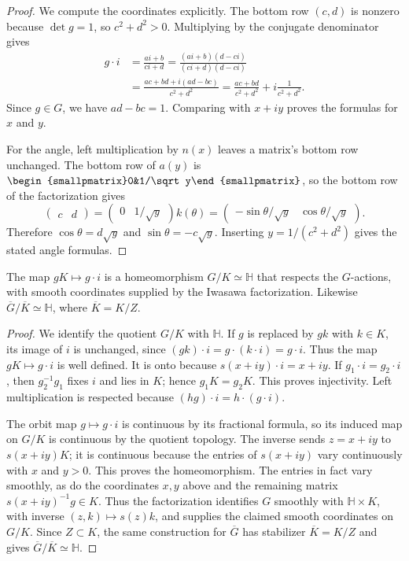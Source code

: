 \begin{proof}
We compute the coordinates explicitly. The bottom row $(c,d)$ is nonzero because $\det g=1$, so $c^2+d^2>0$. Multiplying by the conjugate denominator gives
\[
 \begin{aligned}
 g\cdot i
 &=\frac{ai+b}{ci+d}
  =\frac{(ai+b)(d-ci)}{(ci+d)(d-ci)}\\
 &=\frac{ac+bd+i(ad-bc)}{c^2+d^2}
  =\frac{ac+bd}{c^2+d^2}+i\frac1{c^2+d^2}.
 \end{aligned}
\]
Since $g\in G$, we have $ad-bc=1$. Comparing with $x+iy$ proves the formulas for $x$ and $y$.

For the angle, left multiplication by $n(x)$ leaves a matrix's bottom row unchanged. The bottom row of $a(y)$ is $\begin{smallpmatrix}0&1/\sqrt y\end{smallpmatrix}$, so the bottom row of the factorization gives
\[
 \begin{pmatrix}c&d\end{pmatrix}
 =\begin{pmatrix}0&1/\sqrt y\end{pmatrix}k(\theta)
 =\begin{pmatrix}-\sin\theta/\sqrt y&\cos\theta/\sqrt y\end{pmatrix}.
\]
Therefore $\cos\theta=d\sqrt y$ and $\sin\theta=-c\sqrt y$. Inserting $y=1/(c^2+d^2)$ gives the stated angle formulas.
\end{proof}

\begin{theorem}\label{hyperbolic.quotient-description}
The map $gK\mapsto g\cdot i$ is a homeomorphism $G/K\simeq\mathbb H$ that respects the $G$-actions, with smooth coordinates supplied by the Iwasawa factorization. Likewise $\overline G/\overline K\simeq\mathbb H$, where $\overline K=K/Z$.
\end{theorem}

\begin{proof}
We identify the quotient $G/K$ with $\mathbb H$. If $g$ is replaced by $gk$ with $k\in K$, its image of $i$ is unchanged, since $(gk)\cdot i=g\cdot(k\cdot i)=g\cdot i$. Thus the map $gK\mapsto g\cdot i$ is well defined. It is onto because $s(x+iy)\cdot i=x+iy$. If $g_1\cdot i=g_2\cdot i$, then $g_2^{-1}g_1$ fixes $i$ and lies in $K$; hence $g_1K=g_2K$. This proves injectivity. Left multiplication is respected because $(hg)\cdot i=h\cdot(g\cdot i)$.

The orbit map $g\mapsto g\cdot i$ is continuous by its fractional formula, so its induced map on $G/K$ is continuous by the quotient topology. The inverse sends $z=x+iy$ to $s(x+iy)K$; it is continuous because the entries of $s(x+iy)$ vary continuously with $x$ and $y>0$. This proves the homeomorphism. The entries in fact vary smoothly, as do the coordinates $x,y$ above and the remaining matrix $s(x+iy)^{-1}g\in K$. Thus the factorization identifies $G$ smoothly with $\mathbb H\times K$, with inverse $(z,k)\mapsto s(z)k$, and supplies the claimed smooth coordinates on $G/K$. Since $Z\subset K$, the same construction for $\overline G$ has stabilizer $\overline K=K/Z$ and gives $\overline G/\overline K\simeq\mathbb H$.
\end{proof}

